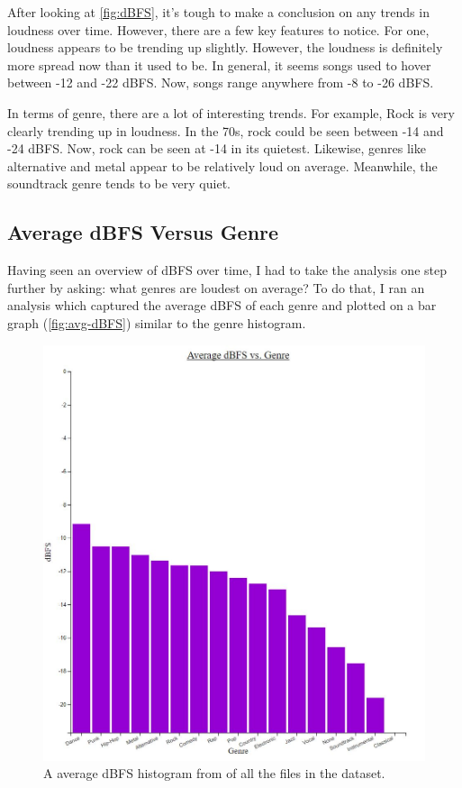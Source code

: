 \documentclass[journal]{vgtc}                %
\begin{document}
After looking at \autoref{fig:dBFS}, it's tough to make a conclusion on any
trends in loudness over time. However, there are a few key features to notice.
For one, loudness appears to be trending up slightly. However, the loudness
is definitely more spread now than it used to be. In general, it seems songs
used to hover between -12 and -22 dBFS. Now, songs range anywhere from -8 to -26
dBFS.

In terms of genre, there are a lot of interesting trends. For example, Rock
is very clearly trending up in loudness. In the 70s, rock could be seen between
-14 and -24 dBFS. Now, rock can be seen at -14 in its quietest. Likewise,
genres like alternative and metal appear to be relatively loud on average.
Meanwhile, the soundtrack genre tends to be very quiet.

\subsection{Average dBFS Versus Genre}

Having seen an overview of dBFS over time, I had to take the analysis one step
further by asking: what genres are loudest on average? To do that, I ran an
analysis which captured the average dBFS of each genre and plotted on a bar
graph (\autoref{fig:avg-dBFS}) similar to the genre histogram.

\begin{figure}[h]
 \centering %
 \includegraphics[width=\columnwidth]{average-dbfs-vs-genre}
 \caption{A average dBFS histogram from \cite{Grifski:2019:Average} of all the files in the dataset.}
 \label{fig:avg-dBFS}
\end{figure}
\end{document}
